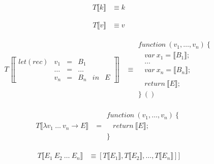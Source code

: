 \begin{align*}
T \llbracket k \rrbracket &\equiv k
\end{align*}

\begin{align*}
T \llbracket v \rrbracket &\equiv v
\end{align*}

\begin{align*}
T \left \llbracket \begin{array}{cccccc}
let(rec) & v_1    & = & B_1    &    & \\
         & \ldots & = & \ldots &    & \\
         & v_n    & = & B_n    & in & E
\end{array} \right \rrbracket &\equiv \begin{array}{l}
function\ (v_1, \ldots, v_n)\ \{ \\
\ \ \ \ var\ x_1 = \llbracket B_1 \rrbracket; \\
\ \ \ \ \ldots \\
\ \ \ \ var\ x_n = \llbracket B_n \rrbracket; \\
\\
\ \ \ \ return\ \llbracket E \rrbracket; \\
\}\ ()
\end{array}
\end{align*}

\begin{align*}
T\llbracket \lambda v_1 \: \ldots \: v_n \rightarrow E \rrbracket &= \begin{array}{l}
function\ (v_1, \ldots, v_n)\ \{ \\
\ \ \ \ return\ \llbracket E \rrbracket; \\
\}
\end{array}
\end{align*}

\begin{align*}
T \llbracket E_1 \: E_2 \: \ldots \: E_n \rrbracket &
    \equiv [T \llbracket E_1 \rrbracket, T \llbracket E_2 \rrbracket, \ldots, T \llbracket E_n \rrbracket]]
\end{align*}

